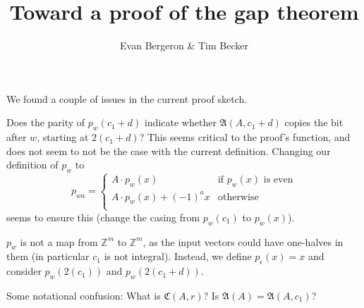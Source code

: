 \documentclass{article}
\title{Toward a proof of the gap theorem}
\author{Evan Bergeron \& Tim Becker}
\newcommand{\0}{\underline{0}}
\newcommand{\1}{\underline{1}}
\newcommand{\2}{\underline{2}}
\newcommand{\Z}{\mathbb{Z}}
\begin{document}
\maketitle
We found a couple of issues in the current proof sketch.

Does the parity of $p_w(c_1 + d)$ indicate whether $\mathfrak{A}(A, c_1 + d)$ copies the bit after $w$, starting at $2(c_1 + d)$? This seems critical to the proof's function, and does not seem to not be the case with the current definition. Changing our definition of $p_w$ to 
\[
p_{wa} = \begin{cases}
A \cdot p_w(x)&\text{if $p_w(x)$ is even}\\
A \cdot p_w(x)+(-1)^ax&\text{otherwise}\\
\end{cases}
\]
seems to ensure this (change the casing from $p_w(c_1)$ to $p_w(x)$).

$p_w$ is not a map from $\Z^m$ to $\Z^m$, as the input vectors could have one-halves in them (in particular $c_1$ is not integral). Instead, we define $p_\epsilon(x) = x$ and consider $p_w(2(c_1))$ and $p_w(2(c_1 + d))$.

Some notational confusion: What is $\mathfrak{C}(A, r)$? Is $\mathfrak{A}(A) = \mathfrak{A}(A, c_1)$?
\end{document}
